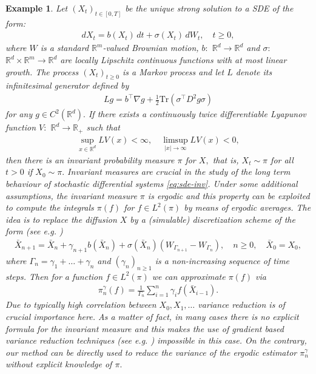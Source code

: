 \documentclass[bj]{imsart}
\newtheorem{example}{Example}
\begin{document}
\begin{example}
  Let \((X_t)_{t\in [0,T]}\) be the unique strong solution to a  SDE of the form:
\begin{eqnarray}
\label{eq:sde-inv}
dX_t=b(X_t)\,dt+\sigma(X_t)\,dW_t,\quad t\geq 0,	
\end{eqnarray}
where \(W\) is a standard \(\mathbb{R}^m\)-valued Brownian motion, \(b:\) \(\mathbb{R}^d\to \mathbb{R}^d\) and \(\sigma:\) \(\mathbb{R}^d\times \mathbb{R}^m \to \mathbb{R}^d\) are locally Lipschitz continuous functions with at most linear growth.
The process \((X_t)_{t\geq 0}\) is a Markov
process and let \(L\) denote its infinitesimal generator defined by
\begin{eqnarray*}
Lg=b^\top \nabla g+\frac{1}{2}\text{Tr}(\sigma^\top D^2g\sigma)
\end{eqnarray*}
for any \(g\in C^2(\mathbb{R}^d).\)
If there exists a continuously twice differentiable Lyapunov function \(V:\) \(\mathbb{R}^d\to \mathbb{R}_{+}\) such that
\begin{eqnarray*}
\sup_{x\in \mathbb{R}^d} LV(x) <\infty,\quad \limsup_{|x|\to \infty} LV(x)<0,
\end{eqnarray*}
then there is an invariant probability measure \(\pi\)  for \(X,\) that is, \(X_t\sim \pi\) for all \(t> 0\) if \(X_0\sim \pi.\) Invariant measures are crucial in the study of the long term behaviour of stochastic differential
systems \eqref{eq:sde-inv}.    Under some additional assumptions,  the invariant
measure \(\pi\) is  ergodic and this property
can be exploited  to compute  the integrals \(\pi(f)\) for \(f\in L^2(\pi)\) by means of ergodic averages. The idea is to replace the diffusion \(X\) by a (simulable) discretization scheme of the form (see e.g. \cite{MR3861816})
\begin{eqnarray*}
\bar X_{n+1}=\bar X_n+\gamma_{n+1} b(\bar X_n)+\sigma(\bar X_n)(W_{\Gamma_{n+1}}-W_{\Gamma_n}), \quad n\geq 0,\quad \bar X_0=X_0,
\end{eqnarray*}
where \(\Gamma_n=\gamma_1+\ldots+\gamma_n\) and \((\gamma_n)_{n\geq 1}\) is a non-increasing sequence of time steps. Then for a function \(f\in L^2(\pi)\) we can approximate \(\pi(f)\) via
\begin{eqnarray*}
\pi_n^\gamma(f)=\frac{1}{\Gamma_n}\sum_{i=1}^n \gamma_{i}f(\bar X_{i-1}).
\end{eqnarray*}
Due to typically high correlation between \(X_0,X_1,\ldots\)  variance reduction is of crucial importance here.
As a matter of fact, in many cases there is no explicit formula for the invariant measure and this makes the use of gradient  based  variance reduction techniques (see e.g. \cite{mira2013zero})   impossible in this case.
On the contrary, our method can be directly used to reduce the variance of the ergodic estimator \(\pi_n^\gamma\) without explicit knowledge of \(\pi.\)
\end{example}
\end{document}
